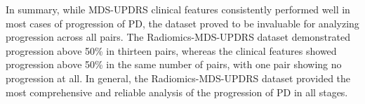 \documentclass[twocolumn]{article}
\begin{document}
In summary, while MDS-UPDRS clinical features consistently performed well in most cases of progression of PD, the dataset proved to be invaluable for analyzing progression across all pairs. The Radiomics-MDS-UPDRS dataset demonstrated progression above 50\% in thirteen pairs, whereas the clinical features showed progression above 50\% in the same number of pairs, with one pair showing no progression at all. In general, the Radiomics-MDS-UPDRS dataset provided the most comprehensive and reliable analysis of the progression of PD in all stages.

\begin{table}[ht!]
\centering
\caption{\textcolor{blue}{Bidirectional LSTM performance for longitudinal severity prediction}}
\label{tab:longitudinal_performance}

\fontsize{8pt}{9pt}\selectfont 
\renewcommand{\arraystretch}{1}
\setlength{\tabcolsep}{3pt}

\end{table}
\end{document}
